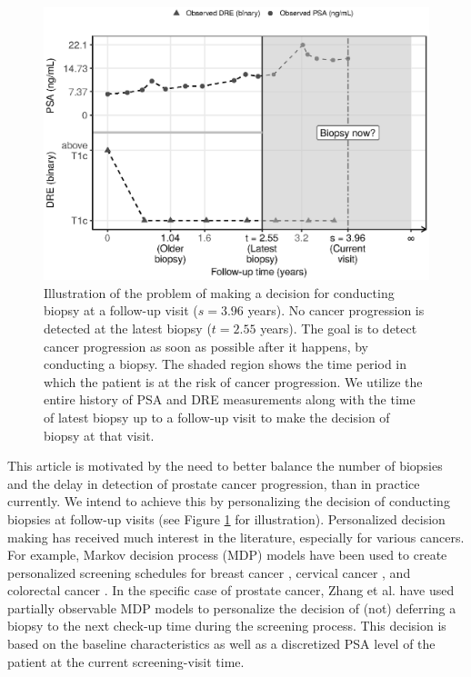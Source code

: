 \begin{figure}[!htb]
\captionsetup{justification=justified}
\centerline{\includegraphics[width=\columnwidth]{images/obsDataPlot_2340.eps}}
\caption{Illustration of the problem of making a decision for conducting biopsy at a follow-up visit ($s=3.96$ years). No cancer progression is detected at the latest biopsy ($t=2.55$ years). The goal is to detect cancer progression as soon as possible after it happens, by conducting a biopsy. The shaded region shows the time period in which the patient is at the risk of cancer progression. We utilize the entire history of PSA and DRE measurements along with the time of latest biopsy up to a follow-up visit to make the decision of biopsy at that visit.}
\label{fig:obsDataPlot_2340}
\end{figure}

This article is motivated by the need to better balance the number of biopsies and the delay in detection of prostate cancer progression, than in practice currently. We intend to achieve this by personalizing the decision of conducting biopsies at follow-up visits (see Figure \ref{fig:obsDataPlot_2340} for illustration). Personalized decision making has received much interest in the literature, especially for various cancers. For example, Markov decision process (MDP) models have been used to create personalized screening schedules for breast cancer \cite{ayer2012or}, cervical cancer \cite{akhavan2017markov}, and colorectal cancer \cite{erenay2014optimizing}. In the specific case of prostate cancer, Zhang et al. \cite{zhang2012optimization} have used partially observable MDP models to personalize the decision of (not) deferring a biopsy to the next check‐up time during the screening process. This decision is based on the baseline characteristics as well as a discretized PSA level of the patient at the current screening-visit time.

